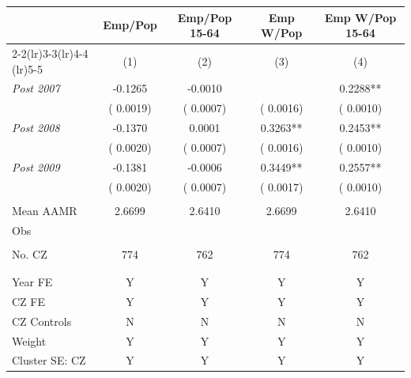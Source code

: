 \begin{tabular}{lcccc} \hline \hline
& \multicolumn{1}{c}{Emp/Pop} & \multicolumn{1}{c}{Emp/Pop 15-64} & \multicolumn{1}{c}{Emp W/Pop} & \multicolumn{1}{c}{Emp W/Pop 15-64}  \\ 
\cmidrule(lr){2-2}\cmidrule(lr){3-3}\cmidrule(lr){4-4} \cmidrule(lr){5-5}
& (1) & (2) & (3) & (4)\\  \toprule
\textit{Post 2007} &      -0.1265  &      -0.0010 &  &       0.2288**\\  
& (      0.0019)  & (      0.0007) & (      0.0016) & (      0.0010)\\ 
\textit{Post 2008} &      -0.1370  &       0.0001 &       0.3263** &       0.2453**\\  
 & (      0.0020)  & (      0.0007) & (      0.0016) & (      0.0010)\\ 
\textit{Post 2009} &      -0.1381  &      -0.0006 &       0.3449** &       0.2557**\\  
& (      0.0020)  & (      0.0007) & (      0.0017) & (      0.0010)\\ 
&  &   &  &   \\ 
Mean AAMR &       2.6699  &       2.6410 &       2.6699 &       2.6410  \\  
Obs &   &  &  &  \\ \\  
No. CZ &          774  &          762 &          774 &          762 \\ \\  
&  &  &  &         \\  
Year FE & Y & Y & Y & Y  \\ 
CZ FE & Y & Y & Y & Y \\ 
CZ Controls & N  & N & N & N    \\  
Weight & Y & Y & Y & Y \\ 
Cluster SE: CZ & Y & Y & Y & Y \\ 
\bottomrule
\end{tabular}